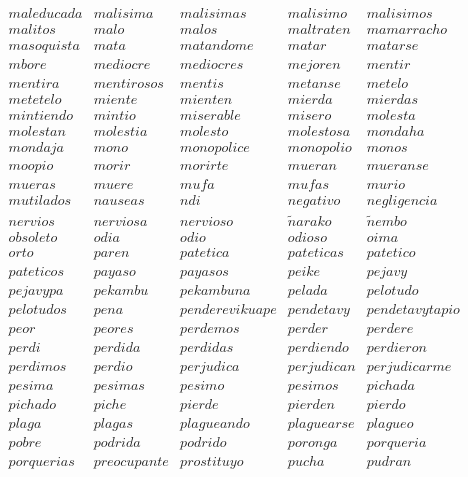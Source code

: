 \noindent
$
\begin{array}{ccccc}
maleducada & malisima & malisimas & malisimo & malisimos \\
malitos & malo & malos & maltraten & mamarracho \\
masoquista & mata & matandome & matar & matarse \\
mbore & mediocre & mediocres & mejoren & mentir \\
mentira & mentirosos & mentis & metanse & metelo \\
metetelo & miente & mienten & mierda & mierdas \\
mintiendo & mintio & miserable & misero & molesta \\
molestan & molestia & molesto & molestosa & mondaha \\
mondaja & mono & monopolice & monopolio & monos \\
moopio & morir & morirte & mueran & mueranse \\
mueras & muere & mufa & mufas & murio \\
mutilados & nauseas & ndi & negativo & negligencia \\
nervios & nerviosa & nervioso & \tilde{n}arako & \tilde{n}embo \\
obsoleto & odia & odio & odioso & oima \\
orto & paren & patetica & pateticas & patetico \\
pateticos & payaso & payasos & peike & pejavy \\
pejavypa & pekambu & pekambuna & pelada & pelotudo \\
pelotudos & pena & penderevikuape & pendetavy & pendetavytapio \\
peor & peores & perdemos & perder & perdere \\
perdi & perdida & perdidas & perdiendo & perdieron \\
perdimos & perdio & perjudica & perjudican & perjudicarme \\
pesima & pesimas & pesimo & pesimos & pichada \\
pichado & piche & pierde & pierden & pierdo \\
plaga & plagas & plagueando & plaguearse & plagueo \\
pobre & podrida & podrido & poronga & porqueria \\
porquerias & preocupante & prostituyo & pucha & pudran \\
\end{array}
$

